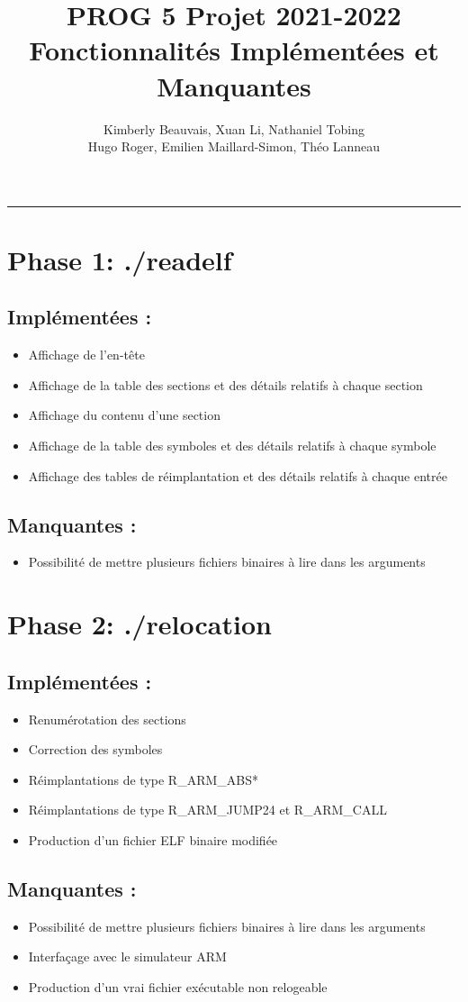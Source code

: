 \documentclass[a4paper]{article} %
\title{PROG 5 Projet 2021-2022 \\
\large Fonctionnalités Implémentées et Manquantes}
\author{Kimberly Beauvais, Xuan Li, Nathaniel Tobing \\
Hugo Roger, Emilien Maillard-Simon, Théo Lanneau}
\begin{document}
\maketitle
\begin{center}
\rule{\textwidth}{1pt}
\end{center}

\section*{Phase 1: ./readelf}

\subsection*{Implémentées :}
\begin{itemize}
    \item Affichage de l'en-tête
    \item Affichage de la table des sections et des détails relatifs à chaque 
    section
    \item Affichage du contenu d'une section
    \item Affichage de la table des symboles et des détails relatifs à chaque 
    symbole
    \item Affichage des tables de réimplantation et des détails relatifs à chaque 
    entrée
\end{itemize}


\subsection*{Manquantes :}
\begin{itemize}
    \item Possibilité de mettre plusieurs fichiers binaires à lire dans les arguments
\end{itemize}


\section*{Phase 2: ./relocation}

\subsection*{Implémentées :}
\begin{itemize}
    \item Renumérotation des sections
    \item Correction des symboles
    \item Réimplantations de type R\_ARM\_ABS* 
    \item Réimplantations de type R\_ARM\_JUMP24 et R\_ARM\_CALL
    \item Production d'un fichier ELF binaire modifiée
\end{itemize}


\subsection*{Manquantes :}
\begin{itemize}
    \item Possibilité de mettre plusieurs fichiers binaires à lire dans les arguments
    \item Interfaçage avec le simulateur ARM
    \item Production d'un vrai fichier exécutable non relogeable
\end{itemize}


\newpage
\end{document}
